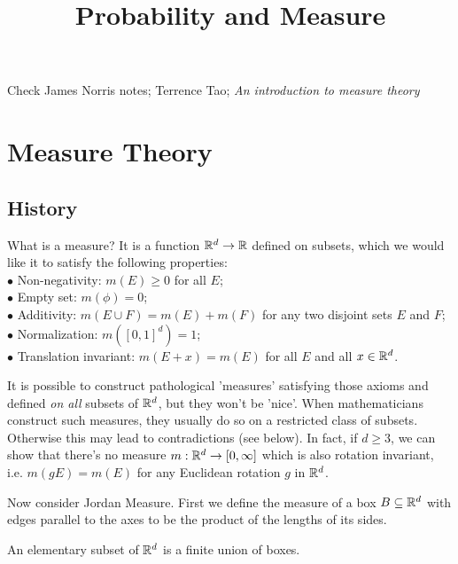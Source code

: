 \documentclass[a4paper]{article}
\begin{document}
\title{Probability and Measure}

\maketitle

\newpage

\tableofcontents

\newpage

Check James Norris notes; Terrence Tao; \emph{An introduction to measure theory}

\newpage

\section{Measure Theory}

\subsection{History}

What is a measure? It is a function $\mathbb{R}^d \to \mathbb{R}$ defined on subsets, which we would like it to satisfy the following properties:\\
$\bullet$ Non-negativity: $m(E) \geq 0$ for all $E$;\\
$\bullet$ Empty set: $m(\phi) = 0$;\\
$\bullet$ Additivity: $m(E \cup F) = m(E)+m(F)$ for any two disjoint sets $E$ and $F$;
$\bullet$ Normalization: $m([0,1]^d) = 1$;\\
$\bullet$ Translation invariant: $m(E+x)=m(E)$ for all $E$ and all $x \in \mathbb{R}^d$.

It is possible to construct pathological 'measures' satisfying those axioms and defined \emph{on all} subsets of $\mathbb{R}^d$, but they won't be 'nice'. When mathematicians construct such measures, they usually do so on a restricted class of subsets. Otherwise this may lead to contradictions (see below). In fact, if $d \geq 3$, we can show that there's no measure $m: \mathbb{R}^d \to [0,\infty]$ which is also rotation invariant, i.e. $m(gE) = m(E)$ for any Euclidean rotation $g$ in $\mathbb{R}^d$.

Now consider Jordan Measure. First we define the measure of a box $B \subseteq \mathbb{R}^d$ with edges parallel to the axes to be the product of the lengths of its sides.

\begin{defi}
An elementary subset of $\mathbb{R}^d$ is a finite union of boxes.
\end{defi}
\end{document}
